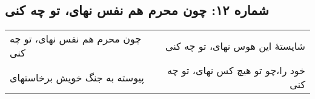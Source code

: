 \begin{center}
\section*{شماره ۱۲: چون محرم هم نفس نهای، تو چه کنی}
\label{sec:012}
\begin{longtable}{l p{0.5cm} r}
چون محرم هم نفس نهای، تو چه کنی
&&
شایستهٔ این هوس نهای، تو چه کنی
\\
پیوسته به جنگ خویش برخاستهای
&&
خود را،‌چو تو هیچ کس نهای، تو چه کنی
\\
\end{longtable}
\end{center}
